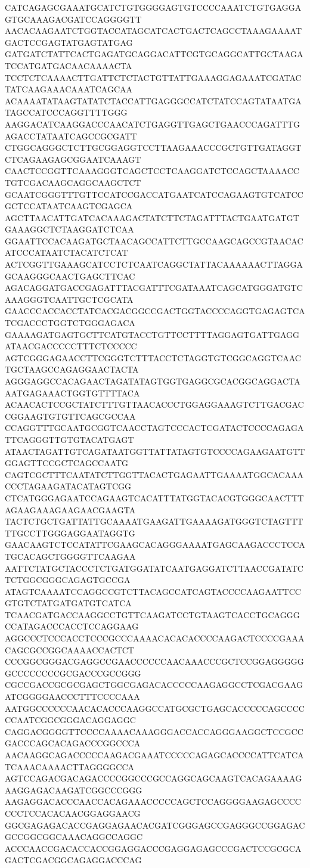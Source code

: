 CATCAGAGCGAAATGCATCTGTGGGGAGTGTCCCCAAATCTGTGAGGAGTGCAAAGACGATCCAGGGGTT
AACACAAGAATCTGGTACCATAGCATCACTGACTCAGCCTAAAGAAAATGACTCCGAGTATGAGTATGAG
GATGATCTATTCACTGAGATGCAGGACATTCGTGCAGGCATTGCTAAGATCCATGATGACAACAAAACTA
TCCTCTCAAAACTTGATTCTCTACTGTTATTGAAAGGAGAAATCGATACTATCAAGAAACAAATCAGCAA
ACAAAATATAAGTATATCTACCATTGAGGGCCATCTATCCAGTATAATGATAGCCATCCCAGGTTTTGGG
AAGGACATCAAGGACCCAACATCTGAGGTTGAGCTGAACCCAGATTTGAGACCTATAATCAGCCGCGATT
CTGGCAGGGCTCTTGCGGAGGTCCTTAAGAAACCCGCTGTTGATAGGTCTCAGAAGAGCGGAATCAAAGT
CAACTCCGGTTCAAAGGGTCAGCTCCTCAAGGATCTCCAGCTAAAACCTGTCGACAAGCAGGCAAGCTCT
GCAATCGGGTTTGTTCCATCCGACCATGAATCATCCAGAAGTGTCATCCGCTCCATAATCAAGTCGAGCA
AGCTTAACATTGATCACAAAGACTATCTTCTAGATTTACTGAATGATGTGAAAGGCTCTAAGGATCTCAA
GGAATTCCACAAGATGCTAACAGCCATTCTTGCCAAGCAGCCGTAACACATCCCATAATCTACATCTCAT
ACTCGGTTGAAAGCATCCTCTCAATCAGGCTATTACAAAAAACTTAGGAGCAAGGGCAACTGAGCTTCAC
AGACAGGATGACCGAGATTTACGATTTCGATAAATCAGCATGGGATGTCAAAGGGTCAATTGCTCGCATA
GAACCCACCACCTATCACGACGGCCGACTGGTACCCCAGGTGAGAGTCATCGACCCTGGTCTGGGAGACA
GAAAAGATGAGTGCTTCATGTACCTGTTCCTTTTAGGAGTGATTGAGGATAACGACCCCCTTTCTCCCCC
AGTCGGGAGAACCTTCGGGTCTTTACCTCTAGGTGTCGGCAGGTCAACTGCTAAGCCAGAGGAACTACTA
AGGGAGGCCACAGAACTAGATATAGTGGTGAGGCGCACGGCAGGACTAAATGAGAAACTGGTGTTTTACA
ACAACACTCCGCTATCTTTGTTAACACCCTGGAGGAAAGTCTTGACGACCGGAAGTGTGTTCAGCGCCAA
CCAGGTTTGCAATGCGGTCAACCTAGTCCCACTCGATACTCCCCAGAGATTCAGGGTTGTGTACATGAGT
ATAACTAGATTGTCAGATAATGGTTATTATAGTGTCCCCAGAAGAATGTTGGAGTTCCGCTCAGCCAATG
CAGTCGCTTTCAATATCTTGGTTACACTGAGAATTGAAAATGGCACAAACCCTAGAAGATACATAGTCGG
CTCATGGGAGAATCCAGAAGTCACATTTATGGTACACGTGGGCAACTTTAGAAGAAAGAAGAACGAAGTA
TACTCTGCTGATTATTGCAAAATGAAGATTGAAAAGATGGGTCTAGTTTTTGCCTTGGGAGGAATAGGTG
GAACAAGTCTCCATATTCGAAGCACAGGGAAAATGAGCAAGACCCTCCATGCACAGCTGGGGTTCAAGAA
AATTCTATGCTACCCTCTGATGGATATCAATGAGGATCTTAACCGATATCTCTGGCGGGCAGAGTGCCGA
ATAGTCAAAATCCAGGCCGTCTTACAGCCATCAGTACCCCAAGAATTCCGTGTCTATGATGATGTCATCA
TCAACGATGACCAAGGCCTGTTCAAGATCCTGTAAGTCACCTGCAGGGCCATAGACCCACCTCCAGGAAG
AGGCCCTCCCACCTCCCGCCCAAAACACACACCCCAAGACTCCCCGAAACAGCGCCGGCAAAACCACTCT
CCCGGCGGGACGAGGCCGAACCCCCCAACAAACCCGCTCCGGAGGGGGGCCCCCCCCGCGACCCGCCGGG
CGCCGACCGCGCGAGCTGGCGAGACACCCCCAAGAGGCCTCGACGAAGATCGGGGAACCCTTTCCCCAAA
AATGGCCCCCCAACACACCCAAGGCCATGCGCTGAGCACCCCCAGCCCCCCAATCGGCGGGACAGGAGGC
CAGGACGGGGTTCCCCAAAACAAAGGGACCACCAGGGAAGGCTCCGCCGACCCAGCACAGACCCGGCCCA
AACAAGGCAGACCCCCAAGACGAAATCCCCCAGAGCACCCCATTCATCATCAAACAAAACTTAGGGGCCA
AGTCCAGACGACAGACCCCGGCCCGCCAGGCAGCAAGTCACAGAAAAGAAGGAGACAAGATCGGCCCGGG
AAGAGGACACCCAACCACAGAAACCCCCAGCTCCAGGGGAAGAGCCCCCCCTCCACACAACGGAGGAACG
GGCGAGAGACACCGAGGAGAACACGATCGGGAGCCGAGGGCCGGAGACGCCGGCGGCAAACAGGCCAGGC
ACCCAACCGACACCACCGGAGGACCCGAGGAGAGCCCGACTCCGCGCAGACTCGACGGCAGAGGACCCAG
